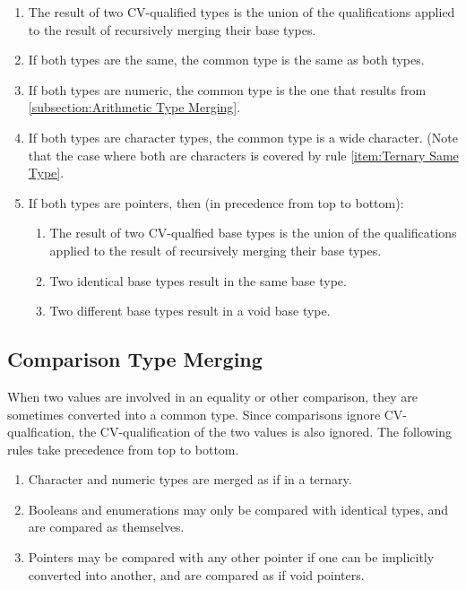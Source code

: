 \documentclass[letterpaper,12pt]{book}
\begin{document}
\begin{enumerate}
	\item The result of two CV-qualified types is the union of the qualifications applied to the result of recursively merging their base types.\label{item:Ternary Same Type}
	
	\item If both types are the same, the common type is the same as both types.
	
	\item If both types are numeric, the common type is the one that results from \ref{subsection:Arithmetic Type Merging}.
	
	\item If both types are character types, the common type is a wide character. (Note that the case where both are characters is covered by rule \ref{item:Ternary Same Type}.
	
	\item If both types are pointers, then (in precedence from top to bottom):
	\begin{enumerate}
		\item The result of two CV-qualfied base types is the union of the qualifications applied to the result of recursively merging their base types.
		
		\item Two identical base types result in the same base type.
		
		\item Two different base types result in a void base type.
	\end{enumerate}
\end{enumerate}

\subsection{Comparison Type Merging}\label{subsection:Comparison Type Merging}

When two values are involved in an equality or other comparison, they are sometimes converted into a common type. Since comparisons ignore CV-qualfication, the CV-qualification of the two values is also ignored. The following rules take precedence from top to bottom.

\begin{enumerate}
	\item Character and numeric types are merged as if in a ternary.
	
	\item Booleans and enumerations may only be compared with identical types, and are compared as themselves.
	
	\item Pointers may be compared with any other pointer if one can be implicitly converted into another, and are compared as if void pointers.
\end{enumerate}
\end{document}
